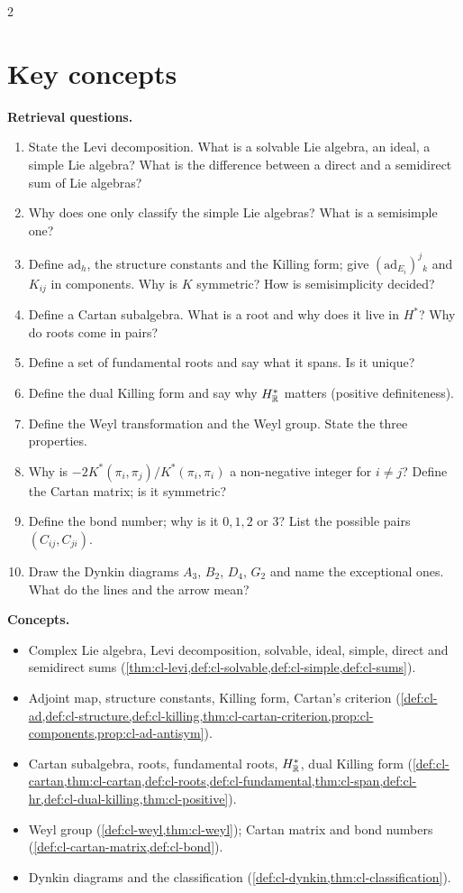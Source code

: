 \begin{paracol}{2}
\section*{Key concepts}
\begin{keyconcepts}
\textbf{Retrieval questions.}
\begin{enumerate}
  \item State the Levi decomposition. What is a solvable Lie algebra, an ideal, a simple Lie algebra? What is the difference between a direct and a semidirect sum of Lie algebras?
  \item Why does one only classify the simple Lie algebras? What is a semisimple one?
  \item Define $\mathrm{ad}_h$, the structure constants and the Killing form; give $(\mathrm{ad}_{E_i})^j{}_k$ and $K_{ij}$ in components. Why is $K$ symmetric? How is semisimplicity decided?
  \item Define a Cartan subalgebra. What is a root and why does it live in $H^*$? Why do roots come in pairs?
  \item Define a set of fundamental roots and say what it spans. Is it unique?
  \item Define the dual Killing form and say why $H^*_{\mathbb{R}}$ matters (positive definiteness).
  \item Define the Weyl transformation and the Weyl group. State the three properties.
  \item Why is $-2K^*(\pi_i,\pi_j)/K^*(\pi_i,\pi_i)$ a non-negative integer for $i\ne j$? Define the Cartan matrix; is it symmetric?
  \item Define the bond number; why is it $0,1,2$ or $3$? List the possible pairs $(C_{ij},C_{ji})$.
  \item Draw the Dynkin diagrams $A_3$, $B_2$, $D_4$, $G_2$ and name the exceptional ones. What do the lines and the arrow mean?
\end{enumerate}
\textbf{Concepts.}
\begin{itemize}
  \item Complex Lie algebra, Levi decomposition, solvable, ideal, simple, direct and semidirect sums (\cref{thm:cl-levi,def:cl-solvable,def:cl-simple,def:cl-sums}).
  \item Adjoint map, structure constants, Killing form, Cartan's criterion (\cref{def:cl-ad,def:cl-structure,def:cl-killing,thm:cl-cartan-criterion,prop:cl-components,prop:cl-ad-antisym}).
  \item Cartan subalgebra, roots, fundamental roots, $H^*_{\mathbb{R}}$, dual Killing form (\cref{def:cl-cartan,thm:cl-cartan,def:cl-roots,def:cl-fundamental,thm:cl-span,def:cl-hr,def:cl-dual-killing,thm:cl-positive}).
  \item Weyl group (\cref{def:cl-weyl,thm:cl-weyl}); Cartan matrix and bond numbers (\cref{def:cl-cartan-matrix,def:cl-bond}).
  \item Dynkin diagrams and the classification (\cref{def:cl-dynkin,thm:cl-classification}).
\end{itemize}
\end{keyconcepts}

\flushside
\end{paracol}
